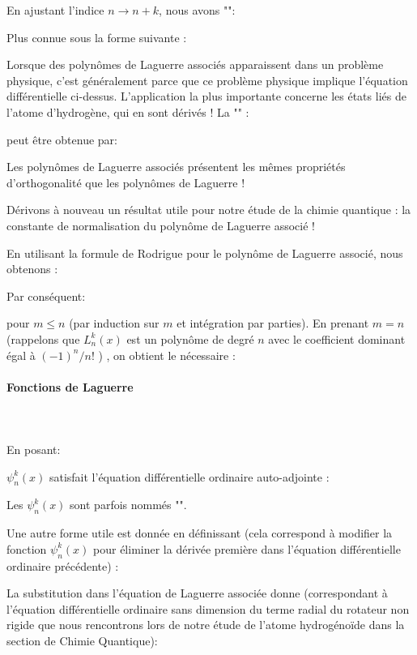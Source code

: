 	En ajustant l'indice $n \rightarrow n+k$, nous avons "":
	
	Plus connue sous la forme suivante :
	
	Lorsque des polynômes de Laguerre associés apparaissent dans un problème physique, c'est généralement parce que ce problème physique implique l'équation différentielle ci-dessus. L'application la plus importante concerne les états liés de l'atome d'hydrogène, qui en sont dérivés ! La "" :
	
	peut être obtenue par:
	
	Les polynômes de Laguerre associés présentent les mêmes propriétés d'orthogonalité que les polynômes de Laguerre !
	
	Dérivons à nouveau un résultat utile pour notre étude de la chimie quantique : la constante de normalisation du polynôme de Laguerre associé !
	
	En utilisant la formule de Rodrigue pour le polynôme de Laguerre associé, nous obtenons :
	
	Par conséquent:
	
	pour $m \leqslant n$ (par induction sur $m$ et intégration par parties). En prenant $m=n$ (rappelons que $L_{n}^{k}(x)$ est un polynôme de degré $n$ avec le coefficient dominant égal à $(-1)^{n} / n !$ ) , on obtient le nécessaire :
	
	
	\paragraph{Fonctions de Laguerre}\label{Laguerre functions}\mbox{}\\\\
	En posant:
	
	$\psi_{n}^{k}(x)$ satisfait l'équation différentielle ordinaire auto-adjointe :
	
	Les $\psi_{n}^{k}(x)$ sont parfois nommés "".
	
	Une autre forme utile est donnée en définissant (cela correspond à modifier la fonction $\psi_{n}^{k}(x)$ pour éliminer la dérivée première dans l'équation différentielle ordinaire précédente) :
	
	La substitution dans l'équation de Laguerre associée donne (correspondant à l'équation différentielle ordinaire sans dimension du terme radial du rotateur non rigide que nous rencontrons lors de notre étude de l'atome hydrogénoïde dans la section de Chimie Quantique)\label{radial term dimensionless non-rigid rotator}:
	

